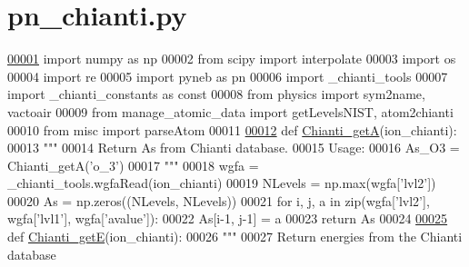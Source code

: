\hypertarget{pn__chianti_8py_source}{}\section{pn\+\_\+chianti.\+py}
\label{pn__chianti_8py_source}

\begin{DoxyCode}
\hypertarget{pn__chianti_8py_source_l00001}{}\hyperlink{namespacepyneb_1_1utils_1_1pn__chianti}{00001} \textcolor{keyword}{import} numpy \textcolor{keyword}{as} np
00002 \textcolor{keyword}{from} scipy \textcolor{keyword}{import} interpolate
00003 \textcolor{keyword}{import} os
00004 \textcolor{keyword}{import} re
00005 \textcolor{keyword}{import} pyneb \textcolor{keyword}{as} pn
00006 \textcolor{keyword}{import} \_chianti\_tools
00007 \textcolor{keyword}{import} \_chianti\_constants \textcolor{keyword}{as} const
00008 \textcolor{keyword}{from} physics \textcolor{keyword}{import} sym2name, vactoair
00009 \textcolor{keyword}{from} manage\_atomic\_data \textcolor{keyword}{import} getLevelsNIST, atom2chianti
00010 \textcolor{keyword}{from} misc \textcolor{keyword}{import} parseAtom
00011 
\hypertarget{pn__chianti_8py_source_l00012}{}\hyperlink{namespacepyneb_1_1utils_1_1pn__chianti_ae701b2adb22d5cde4fd8ae2967b55fd0}{00012} \textcolor{keyword}{def }\hyperlink{namespacepyneb_1_1utils_1_1pn__chianti_ae701b2adb22d5cde4fd8ae2967b55fd0}{Chianti\_getA}(ion\_chianti):
00013     \textcolor{stringliteral}{"""}
00014 \textcolor{stringliteral}{    Return As from Chianti database.}
00015 \textcolor{stringliteral}{    Usage:}
00016 \textcolor{stringliteral}{        As\_O3 = Chianti\_getA('o\_3')}
00017 \textcolor{stringliteral}{    """}
00018     wgfa = \_chianti\_tools.wgfaRead(ion\_chianti)
00019     NLevels = np.max(wgfa[\textcolor{stringliteral}{'lvl2'}])
00020     As = np.zeros((NLevels, NLevels))
00021     \textcolor{keywordflow}{for} i, j, a \textcolor{keywordflow}{in} zip(wgfa[\textcolor{stringliteral}{'lvl2'}], wgfa[\textcolor{stringliteral}{'lvl1'}], wgfa[\textcolor{stringliteral}{'avalue'}]):
00022         As[i-1, j-1] = a
00023     \textcolor{keywordflow}{return} As
00024 
\hypertarget{pn__chianti_8py_source_l00025}{}\hyperlink{namespacepyneb_1_1utils_1_1pn__chianti_a9044db416b867ab604784eb0246c88e2}{00025} \textcolor{keyword}{def }\hyperlink{namespacepyneb_1_1utils_1_1pn__chianti_a9044db416b867ab604784eb0246c88e2}{Chianti\_getE}(ion\_chianti):
00026     \textcolor{stringliteral}{"""}
00027 \textcolor{stringliteral}{    Return energies from the Chianti database}

\end{DoxyCode}
